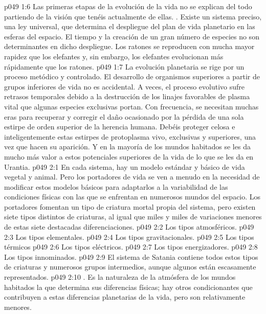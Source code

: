 \vs p049 1:6 Las primeras etapas de la evolución de la vida no se explican del todo partiendo de la visión que tenéis actualmente de ellas. . Existe un sistema preciso, una ley universal, que determina el despliegue del plan de vida planetario en las esferas del espacio. El tiempo y la creación de un gran número de especies no son determinantes en dicho despliegue. Los ratones se reproducen con mucha mayor rapidez que los elefantes y, sin embargo, los elefantes evolucionan más rápidamente que los ratones.
\vs p049 1:7 La evolución planetaria se rige por un proceso metódico y controlado. El desarrollo de organismos superiores a partir de grupos inferiores de vida no es accidental. A veces, el proceso evolutivo sufre retrasos temporales debido a la destrucción de los linajes favorables de plasma vital que algunas especies exclusivas portan. Con frecuencia, se necesitan muchas eras para recuperar y corregir el daño ocasionado por la pérdida de una sola estirpe de orden superior de la herencia humana. Debéis proteger celosa e inteligentemente estas estirpes de protoplasma vivo, exclusivas y superiores, una vez que hacen su aparición. Y en la mayoría de los mundos habitados se les da mucho más valor a estos potenciales superiores de la vida de lo que se les da en Urantia.
\vs p049 2:1 En cada sistema, hay un modelo estándar y básico de vida vegetal y animal. Pero los portadores de vida se ven a menudo en la necesidad de modificar estos modelos básicos para adaptarlos a la variabilidad de las condiciones físicas con las que se enfrentan en numerosos mundos del espacio. Los portadores fomentan un tipo de criatura mortal propia del sistema, pero existen siete tipos distintos de criaturas, al igual que miles y miles de variaciones menores de estas siete destacadas diferenciaciones.
\vs p049 2:2 Los tipos atmosféricos.
\vs p049 2:3 Los tipos elementales.
\vs p049 2:4 Los tipos gravitacionales.
\vs p049 2:5 Los tipos térmicos
\vs p049 2:6 Los tipos eléctricos.
\vs p049 2:7 Los tipos energizadores.
\vs p049 2:8 Los tipos innominados.
\vs p049 2:9 \pc El sistema de Satania contiene todos estos tipos de criaturas y numerosos grupos intermedios, aunque algunos están escasamente representados.
\vs p049 2:10 . Es la naturaleza de la atmósfera de los mundos habitados la que determina sus diferencias físicas; hay otros condicionantes que contribuyen a estas diferencias planetarias de la vida, pero son relativamente menores.
